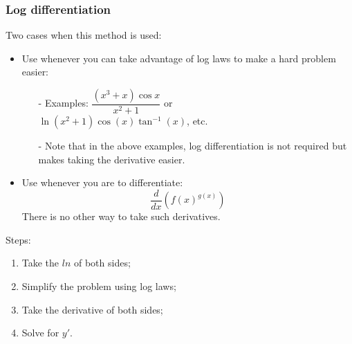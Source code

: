 \subsubsection*{Log differentiation}
\par 
Two cases when this method is used:
\begin{itemize}
    \item Use whenever you can take advantage of log laws to make a hard problem easier:
    \begin{itemize}
        \item[-] Examples: $\dfrac{\left(x^3 + x\right)\cos x}{x^2 + 1}$ or \\[0.25cm] $\ln \left(x^2 + 1\right)\cos (x) \tan^{-1}(x)$, etc.
        \item[-] Note that in the above examples, log differentiation is not required but makes taking the derivative easier. 
    \end{itemize}
    \item Use whenever you are to differentiate:
    \[
        \dfrac{d}{dx} \left(f(x)^{g(x)}\right)  
    \]
    There is no other way to take such derivatives.
\end{itemize}
\par 
Steps:
\begin{enumerate}
    \item Take the $ln$ of both sides;
    \item Simplify the problem using log laws;
    \item Take the derivative of both sides;
    \item Solve for $y'$.
\end{enumerate}